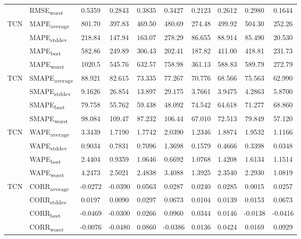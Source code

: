 {\begin{longtable}{l l c c c c c c c c}
 & RMSE\textsubscript{worst} & 0.5359 & 0.2843 & 0.3835 & 0.3427 & 0.2123 & 0.2612 & 0.2980 & 0.1644 \\
\cmidrule(lr){2-10}
\multirow{4}{*}{TCN} & MAPE\textsubscript{average} & 801.70 & 397.83 & 469.50 & 480.69 & 274.48 & 499.92 & 504.30 & 252.26 \\
 & MAPE\textsubscript{stddev} & 218.84 & 147.94 & 163.07 & 278.29 & 86.655 & 88.914 & 85.490 & 20.530 \\
 & MAPE\textsubscript{best} & 582.86 & 249.89 & 306.43 & 202.41 & 187.82 & 411.00 & 418.81 & 231.73 \\
 & MAPE\textsubscript{worst} & 1020.5 & 545.76 & 632.57 & 758.98 & 361.13 & 588.83 & 589.79 & 272.79 \\
\cmidrule(lr){2-10}
\multirow{4}{*}{TCN} & SMAPE\textsubscript{average} & 88.921 & 82.615 & 73.335 & 77.267 & 70.776 & 68.566 & 75.563 & 62.990 \\
 & SMAPE\textsubscript{stddev} & 9.1626 & 26.854 & 13.897 & 29.175 & 3.7661 & 3.9475 & 4.2863 & 5.8700 \\
 & SMAPE\textsubscript{best} & 79.758 & 55.762 & 59.438 & 48.092 & 74.542 & 64.618 & 71.277 & 68.860 \\
 & SMAPE\textsubscript{worst} & 98.084 & 109.47 & 87.232 & 106.44 & 67.010 & 72.513 & 79.849 & 57.120 \\
\cmidrule(lr){2-10}
\multirow{4}{*}{TCN} & WAPE\textsubscript{average} & 3.3439 & 1.7190 & 1.7742 & 2.0390 & 1.2346 & 1.8874 & 1.9532 & 1.1166 \\
 & WAPE\textsubscript{stddev} & 0.9034 & 0.7831 & 0.7096 & 1.3698 & 0.1579 & 0.4666 & 0.3398 & 0.0348 \\
 & WAPE\textsubscript{best} & 2.4404 & 0.9359 & 1.0646 & 0.6692 & 1.0768 & 1.4208 & 1.6134 & 1.1514 \\
 & WAPE\textsubscript{worst} & 4.2473 & 2.5021 & 2.4838 & 3.4088 & 1.3925 & 2.3540 & 2.2930 & 1.0819 \\
\cmidrule(lr){2-10}
\multirow{4}{*}{TCN} & CORR\textsubscript{average} & -0.0272 & -0.0390 & 0.0563 & 0.0287 & 0.0240 & 0.0285 & 0.0015 & 0.0257 \\
 & CORR\textsubscript{stddev} & 0.0197 & 0.0090 & 0.0297 & 0.0673 & 0.0104 & 0.0139 & 0.0153 & 0.0673 \\
 & CORR\textsubscript{best} & -0.0469 & -0.0300 & 0.0266 & 0.0960 & 0.0344 & 0.0146 & -0.0138 & -0.0416 \\
 & CORR\textsubscript{worst} & -0.0076 & -0.0480 & 0.0860 & -0.0386 & 0.0136 & 0.0424 & 0.0169 & 0.0929 \\

\end{longtable}}
